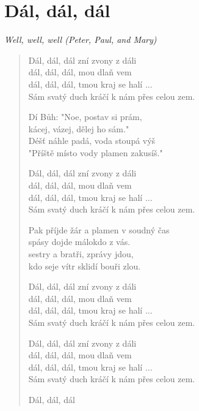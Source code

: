 \section{Dál, dál, dál}
\textit{Well, well, well (Peter, Paul, and Mary)}

\begin{verse}
Dál, dál, dál zní zvony z dáli \\
dál, dál, dál, mou dlaň vem \\
dál, dál, dál, tmou kraj se halí ... \\
Sám svatý duch kráčí k nám přes celou zem.

Dí Bůh: "Noe, postav si prám, \\
kácej, vázej, dělej ho sám." \\
Déšť náhle padá, voda stoupá výš \\
"Příště místo vody plamen zakusíš."

Dál, dál, dál zní zvony z dáli \\
dál, dál, dál, mou dlaň vem \\
dál, dál, dál, tmou kraj se halí ... \\
Sám svatý duch kráčí k nám přes celou zem.

Pak příjde žár a plamen v soudný čas \\ 
spásy dojde málokdo z vás. \\
sestry a bratři, zprávy jdou, \\
kdo seje vítr sklidí bouři zlou. 

Dál, dál, dál zní zvony z dáli \\
dál, dál, dál, mou dlaň vem \\
dál, dál, dál, tmou kraj se halí ... \\
Sám svatý duch kráčí k nám přes celou zem.

Dál, dál, dál zní zvony z dáli \\
dál, dál, dál, mou dlaň vem \\
dál, dál, dál, tmou kraj se halí ... \\
Sám svatý duch kráčí k nám přes celou zem.

Dál, dál, dál
\end{verse}
